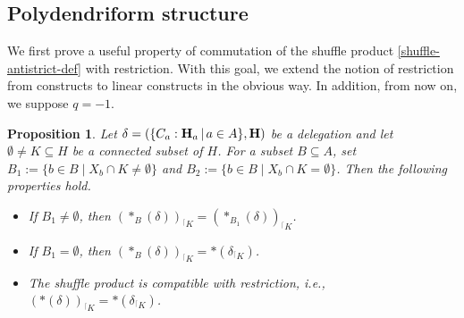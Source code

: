 \documentclass{article}
\theoremstyle{plain}
\newtheorem{proposition}[thm]{Proposition}
\theoremstyle{definition}
\newcommand{\inc}{\subseteq}
\newcommand{\set}[1]{\{#1\}}
\newcommand{\setc}[2]{\set{#1 \mid #2}}
\newcommand{\inter}{\cap}
\newcommand{\restrconstr}[2]{{#1}_{{}^\lceil {#2}}}
\begin{document}
\subsection{Polydendriform structure} \label{associativity-section} \label{restriction-characterisation-subsection}
We first prove a  useful property of commutation of the shuffle product  \eqref{shuffle-antistrict-def} with restriction. With this goal, we extend the  notion of restriction from constructs to linear constructs in the obvious way. In addition, from now on, we suppose $q=-1$.
 
\begin{proposition} \label{shuffle-restriction}
Let $\delta = (\{C_a:{\bf H}_a\,|\, a\in A\},{\bf H})$  be a delegation and let $\emptyset\neq K\subseteq H$ be a connected subset of $H$. For a subset $B\inc A$, set  $B_1:=\setc{b\in B}{X_b\inter K\neq\emptyset}$ and
$B_2:=\setc{b\in B}{X_b\inter K=\emptyset}$. Then the following properties hold.
\begin{itemize}
\item[{\em (P$_1$)}] {\it If $B_1\neq\emptyset$, then $\restrconstr{(\ast_B(\delta))}{K}=\restrconstr{(\ast_{B_1}(\delta))}{K}$.}
\item[{\em (P$_2$)}] {\it If $B_1=\emptyset$, then $\restrconstr{(\ast_B(\delta))}{K}=\ast(\restrconstr{\delta}{K})$.}
\item[{\em (P)}] The shuffle product is compatible with restriction, i.e., $\restrconstr{(\ast(\delta))}{K}=\ast(\restrconstr{\delta}{K})$.
\end{itemize}
\end{proposition}
\end{document}
